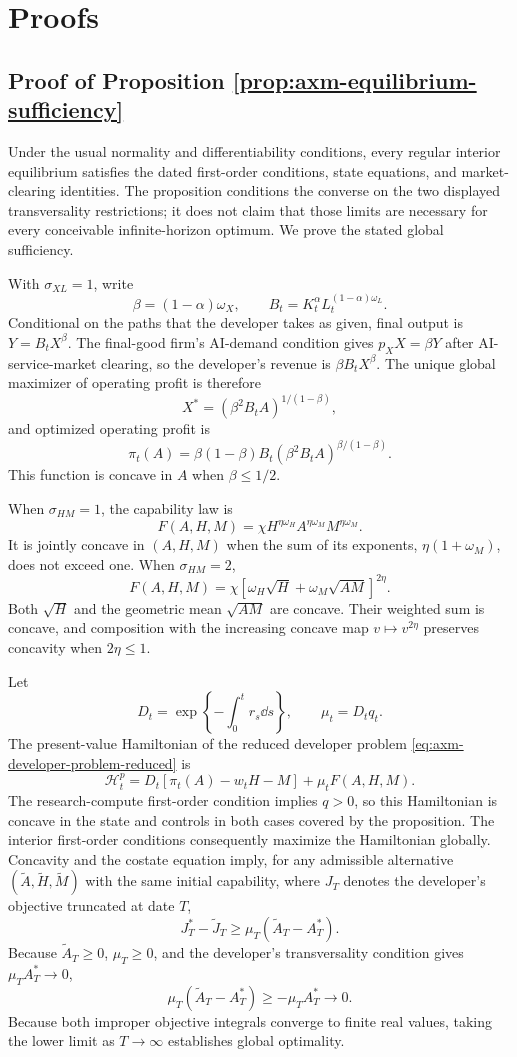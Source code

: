 \section{Proofs}

\subsection{Proof of Proposition \ref{prop:axm-equilibrium-sufficiency}}

Under the usual normality and differentiability conditions, every regular
interior equilibrium satisfies the dated first-order conditions, state equations,
and market-clearing identities. The proposition conditions the converse on the
two displayed transversality restrictions; it does not claim that those limits
are necessary for every conceivable infinite-horizon optimum. We prove the stated
global sufficiency.

With \(\sigma_{XL}=1\), write
\[
 \beta=(1-\alpha)\omega_X,\qquad
 B_t=K_t^\alpha L_t^{(1-\alpha)\omega_L}.
\]
Conditional on the paths that the developer takes as given, final output is
\(Y=B_tX^\beta\). The final-good firm's AI-demand condition gives
\(p_XX=\beta Y\) after AI-service-market clearing, so the developer's revenue is
\(\beta B_tX^\beta\).
The unique global maximizer of operating profit is therefore
\[
 X^*=(\beta^2B_tA)^{1/(1-\beta)},
\]
and optimized operating profit is
\[
 \pi_t(A)=\beta(1-\beta)B_t
 (\beta^2B_tA)^{\beta/(1-\beta)}.
\]
This function is concave in \(A\) when \(\beta\leq1/2\).

When \(\sigma_{HM}=1\), the capability law is
\[
 F(A,H,M)=\chi H^{\eta\omega_H}A^{\eta\omega_M}M^{\eta\omega_M}.
\]
It is jointly concave in \((A,H,M)\) when the sum of its exponents,
\(\eta(1+\omega_M)\), does not exceed one. When \(\sigma_{HM}=2\),
\[
 F(A,H,M)=\chi\left[\omega_H\sqrt H+
 \omega_M\sqrt{AM}\right]^{2\eta}.
\]
Both \(\sqrt H\) and the geometric mean \(\sqrt{AM}\) are concave. Their
weighted sum is concave, and composition with the increasing concave map
\(v\mapsto v^{2\eta}\) preserves concavity when \(2\eta\leq1\).

Let
\[
 D_t=\exp\left\{-\int_0^t r_s\dd s\right\},
 \qquad \mu_t=D_tq_t.
\]
The present-value Hamiltonian of the reduced developer problem
\eqref{eq:axm-developer-problem-reduced} is
\[
 \mathcal H_t^p
 =D_t[\pi_t(A)-w_tH-M]+\mu_tF(A,H,M).
\]
The research-compute first-order condition implies \(q>0\), so this Hamiltonian
is concave in the state and controls in both cases covered by the proposition.
The interior first-order conditions consequently maximize the Hamiltonian
globally. Concavity and the costate equation imply, for any admissible alternative
\((\widetilde A,\widetilde H,\widetilde M)\) with the same initial capability,
where \(J_T\) denotes the developer's objective truncated at date \(T\),
\[
 J_T^*-\widetilde J_T
 \geq \mu_T(\widetilde A_T-A_T^*).
\]
Because \(\widetilde A_T\geq0\), \(\mu_T\geq0\), and the developer's
transversality condition gives \(\mu_TA_T^*\to0\),
\[
 \mu_T(\widetilde A_T-A_T^*)\geq-\mu_TA_T^*\to0.
\]
Because both improper objective integrals converge to finite real values,
taking the lower limit as \(T\to\infty\) establishes global optimality.

